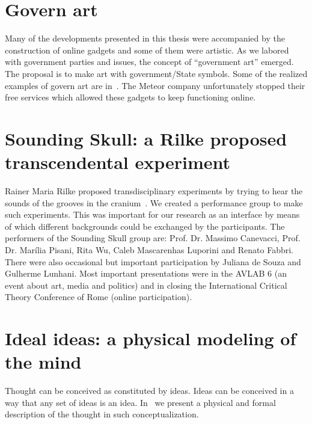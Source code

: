 \begin{apendicesenv}
\section{Govern art}\label{sec:govArt}
Many of the developments presented in this thesis were accompanied by the construction of online gadgets
and some of them were artistic.
As we labored with government parties and issues,
the concept of ``government art'' emerged.
The proposal is to make art with government/State symbols.
Some of the realized examples of govern art are in~\cite{aars}.
The Meteor company unfortunately stopped their free services which
allowed these gadgets to keep functioning online.

\section{Sounding Skull: a Rilke proposed transcendental experiment}\label{sec:soundSkull}
Rainer Maria Rilke proposed transdisciplinary experiments by trying to hear the
sounds of the grooves in the cranium~\cite{rilke}.
We created a performance group to make such experiments.
This was important for our research as an interface
by means of which different backgrounds could be exchanged by the participants.
The performers of the Sounding Skull group are:
Prof. Dr. Massimo Canevacci, Prof. Dr. Marília Pisani,
Rita Wu, Caleb Mascarenhas Luporini and Renato Fabbri.
There were also occasional but important participation
by Juliana de Souza and Gulherme Lunhani.
Most important presentations were in the AVLAB 6 (an event about art, media and politics)
and in closing the International Critical Theory Conference of Rome (online participation).

\section{Ideal ideas: a physical modeling of the mind}
Thought can be conceived as constituted by ideas.
Ideas can be conceived in a way that any set of ideas is an idea.
In~\cite{idealIdeas} we present a physical and formal description of the
thought in such conceptualization.


\end{apendicesenv}
